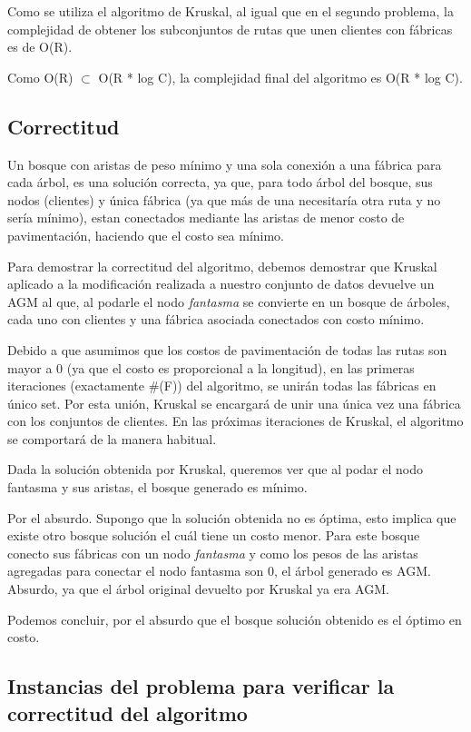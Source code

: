 \documentclass[a4paper, 10pt, twoside]{article}
\begin{document}
Como se utiliza el algoritmo de Kruskal, al igual que en el segundo problema, la complejidad de obtener los subconjuntos de rutas que unen clientes con fábricas es de O(R).

Como O(R) $\subset$ O(R * log C), la complejidad final del algoritmo es O(R * log C).


\subsection{Correctitud}

Un bosque con aristas de peso mínimo y una sola conexión a una fábrica para cada árbol, es una solución correcta, ya que, para todo árbol del bosque, sus nodos (clientes) y única fábrica (ya que más de una necesitaría otra ruta y no sería mínimo), estan conectados mediante las aristas de menor costo de pavimentación, haciendo que el costo sea mínimo.

Para demostrar la correctitud del algoritmo, debemos demostrar que Kruskal aplicado a la modificación realizada a nuestro conjunto de datos devuelve un AGM al que, al podarle el nodo \textit{fantasma} se convierte en un bosque de árboles, cada uno con clientes y una fábrica asociada conectados con costo mínimo.

Debido a que asumimos que los costos de pavimentación de todas las rutas son mayor a 0 (ya que el costo es proporcional a la longitud), en las primeras iteraciones (exactamente \#(F)) del algoritmo, se unirán todas las fábricas en único set. Por esta unión, Kruskal se encargará de unir una única vez una fábrica con los conjuntos de clientes. En las próximas iteraciones de Kruskal, el algoritmo se comportará  de la manera habitual.

Dada la solución obtenida por Kruskal, queremos ver que al podar el nodo fantasma y sus aristas, el bosque generado es mínimo.

Por el absurdo. Supongo que la solución obtenida no es óptima, esto implica que existe otro bosque solución el cuál tiene un costo menor. Para este bosque conecto sus fábricas con un nodo \textit{fantasma} y como los pesos de las aristas agregadas para conectar el nodo fantasma son 0, el árbol generado es AGM. Absurdo, ya que el árbol original devuelto por Kruskal ya era AGM.

Podemos concluir, por el absurdo que el bosque solución obtenido es el óptimo en costo.


\subsection{Instancias del problema para verificar la correctitud del algoritmo}
\end{document}
